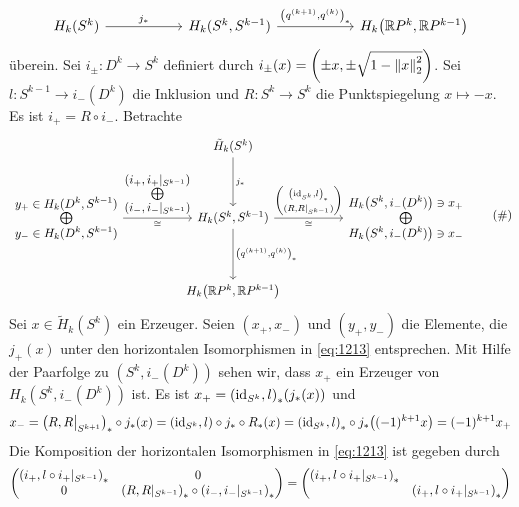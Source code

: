 \[
	\begin{tikzcd}[column sep=5.5em]
		H_k(S^k) \rar["j_*"] & H_k(S^k,S^{k-1}) \rar["\enbrace*{q^{(k+1)},q^{(k)}}_*"] & H_k \enbrace*{\mathds{R}P^k, \mathds{R}P^{k-1}} 
	\end{tikzcd}
\]
überein. Sei $i_{\pm} \colon D^k \to S^k$ definiert durch $i_{\pm}(x)= \enbrace*{\pm x,\pm\sqrt{1-\norm[2]{x}^2}}$. Sei $l\colon S^{k-1} \to i_-(D^k)$ die Inklusion und 
$R \colon S^k \to S^k$ die Punktspiegelung $x \mapsto -x$. Es ist $i_+ = R \circ i_-$. Betrachte
\begin{equation*}
	\begin{tikzcd}[column sep=huge, row sep=large]
		& \tilde{H}_k(S^k) \dar["j_*"] \\
		\bigoplus\limits_{\displaystyle y_- \in H_k(D^k,S^{k-1})}^{\displaystyle y_+ \in H_k(D^k,S^{k-1})} \rar["\bigoplus\limits^{\textstyle(i_+,i_+|_{S^{k-1}})}_{\textstyle(i_-,i_-|_{S^{k-1}})}","\cong"'] 
		& H_k(S^k,S^{k-1}) \dar["\enbrace*{q^{(k+1)},q^{(k)}}_*"] \rar["\cong"',"{\begin{pmatrix}
			\enbrace*{\id_{S^k},l}_* \\ \enbrace{R,R|_{S^{k-1}}}
		\end{pmatrix}}"] 
		& \bigoplus\limits_{\displaystyle H_k \enbrace*{S^k,i_-(D^k)} \ni x_-}^{\displaystyle H_k \enbrace*{S^k,i_-(D^k)} \ni x_+} \\
		& H_k \enbrace*{\mathds{R}P^k,\mathds{R}P^{k-1}} 
	\end{tikzcd}
	\label{eq:1213} \tag{\#}
\end{equation*}
Sei $x \in \tilde{H}_k(S^k)$ ein Erzeuger. Seien $(x_+,x_-)$ und $(y_+,y_-)$ die Elemente, die $j_+(x)$ unter den horizontalen Isomorphismen in \eqref{eq:1213} entsprechen.
Mit Hilfe der Paarfolge zu $(S^k,i_-(D^k))$ sehen wir, dass $x_+$ ein Erzeuger von $H_k(S^k, i_-(D^k))$ ist. Es ist $x_+ = \enbrace*{\id_{S^k},l}_* \enbrace*{j_*(x)} $ und
\begin{align*}
	 x_- = \enbrace*{R,R\big|_{S^{k+1}}}_* \circ j_* (x) = \enbrace*{\id_{S^k},l} \circ j_* \circ R_*(x) = \enbrace*{\id_{S^k},l}_* \circ j_* \enbrace*{(-1)^{k+1}x} = 
	 (-1)^{k+1}x_+    
\end{align*}
Die Komposition der horizontalen Isomorphismen in \eqref{eq:1213} ist gegeben durch 
\[
	\begin{pmatrix}
		\enbrace*{i_+,l \circ i_+|_{S^{k-1}}}_* & 0 \\
		0 & \enbrace*{R,R|_{S^{k-1}}}_*  \circ \enbrace*{i_-, i_-|_{S^{k-1}}}_* 
	\end{pmatrix}= 
	\begin{pmatrix}
		\enbrace*{i_+, l \circ i_+|_{S^{k-1}}}_* & \\
		& \enbrace*{i_+,l \circ i_+|_{S^{k-1}}}_*  
	\end{pmatrix}
\]
